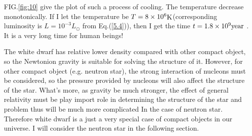 \documentclass[reprint]{revtex4-1}
\begin{document}
FIG.\ref{fig:10} give the plot of such a process of cooling. The temperature decrease monotonically. If I let the temperature be $T = 8 \times {10^6}{\mathop{\rm K}\nolimits} $(corresponding luminosity is $L=10^{-3}L_{\odot}$  from Eq.(\ref{5.4})), then I get the time $t = 1.8 \times {10^9}{\mathop{\rm year}\nolimits} $ . It is a very long time for human beings!\par
The white dwarf has relative lower density compared with other compact object, so the Newtonion gravity is suitable for solving the structure of it. However, for other compact object (e.g. neutron star), the strong interaction of nucleons must be considered, so the pressure provided by nucleons will also affect the structure of the star. What’s more, as gravity be much stronger, the effect of general relativity must be play import role in determining the structure of the star and problem thus will be much more complicated In the case of neutron star. Therefore white dwarf is a just a very special case of compact objects in our universe. I will consider the neutron star in the following section.
\end{document}
